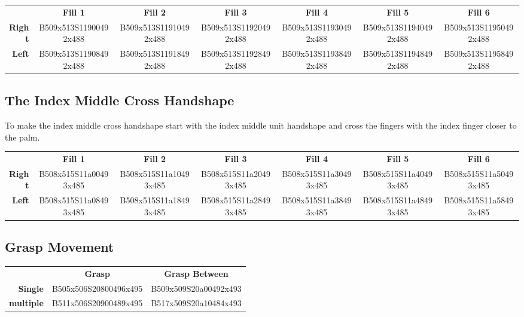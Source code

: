 \documentclass{article}
\begin{document}
\begin{center}
\begin{tabular}{r*{6}{c}}
&\textbf{Fill 1}&\textbf{Fill 2}&\textbf{Fill 3}&\textbf{Fill 4}&\textbf{Fill 5}&\textbf{Fill 6}\\
\textbf{Right}&
B509x513S11900492x488&
B509x513S11910492x488&
B509x513S11920492x488&
B509x513S11930492x488&
B509x513S11940492x488&
B509x513S11950492x488\\
\textbf{Left}&
B509x513S11908492x488&
B509x513S11918492x488&
B509x513S11928492x488&
B509x513S11938492x488&
B509x513S11948492x488&
B509x513S11958492x488\\
\end{tabular}
\end{center}

\subsection{The Index Middle Cross Handshape}

To make the index middle cross handshape start with the index middle unit handshape and cross the fingers with the index finger closer to the palm.

\begin{center}
\begin{tabular}{r*{6}{c}}
&\textbf{Fill 1}&\textbf{Fill 2}&\textbf{Fill 3}&\textbf{Fill 4}&\textbf{Fill 5}&\textbf{Fill 6}\\
\textbf{Right}&
B508x515S11a00493x485&
B508x515S11a10493x485&
B508x515S11a20493x485&
B508x515S11a30493x485&
B508x515S11a40493x485&
B508x515S11a50493x485\\
\textbf{Left}&
B508x515S11a08493x485&
B508x515S11a18493x485&
B508x515S11a28493x485&
B508x515S11a38493x485&
B508x515S11a48493x485&
B508x515S11a58493x485\\
\end{tabular}
\end{center}

\subsection{Grasp Movement}

\begin{center}
\begin{tabular}{r*{2}{c}}
&\textbf{Grasp}&\textbf{Grasp Between}\\
\textbf{Single}  &B505x506S20800496x495&B509x509S20a00492x493\\
\textbf{multiple}&B511x506S20900489x495&B517x509S20a10484x493\\
\end{tabular}
\end{center}
\end{document}

